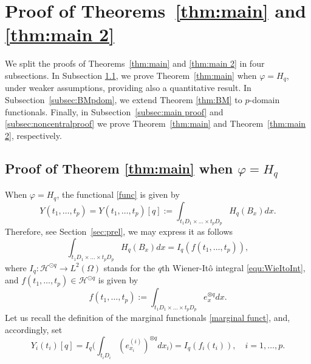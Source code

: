 \documentclass[12pt]{article}
\DeclareMathOperator{\1}{1}
\renewcommand{\L}{ L}
\renewcommand{\phi}{\varphi}
\theoremstyle{plain}
\theoremstyle{definition}
\begin{document}
\section{Proof of Theorems~\ref{thm:main} and \ref{thm:main 2}}\label{sec:sep}

We split the proofs of Theorems~\ref{thm:main} and \ref{thm:main 2} in four subsections. In Subsection \ref{subsec:Hq}, we prove Theorem~\ref{thm:main} when $\phi =H_q$, under weaker assumptions, providing also a quantitative result. In Subsection~\ref{subsec:BMpdom}, we extend Theorem \ref{thm:BM} to $p$-domain functionals. Finally, in Subsection~\ref{subsec:main proof} and \ref{subsec:noncentralproof} we prove Theorem~\ref{thm:main} and Theorem~\ref{thm:main 2}, respectively. 

\subsection{Proof of Theorem \ref{thm:main} when \texorpdfstring{$\phi = H_q$}{}}\label{subsec:Hq}

When $\phi=H_q$, the functional \eqref{func} is given by \begin{equation}
\label{Yq}
      Y(t_1,\ldots,t_p)= Y(t_1,\ldots,t_p)[q]:=\int_{t_1D_1\times\ldots\times t_pD_p} H_q(B_x)dx.
\end{equation}
Therefore, see Section~\ref{sec:prel}, we may express it as follows \begin{equation}\label{equ:defIGP}
    \int_{t_1D_1\times\ldots\times t_pD_p} H_q(B_x)dx = I_q(f(t_1,\ldots,t_p)),
\end{equation}
where $I_q:\mathcal H^{\odot q} \to \L^2(\Omega)$ stands for the $q$th Wiener-It\^o integral \eqref{equ:WieItoInt}, and $f(t_1,\ldots,t_p)\in \mathcal H^{\odot q}$ is given by \begin{equation}
    f(t_1,\ldots,t_p) := \int_{t_1D_1\times\ldots\times t_pD_p} e_{x}^{\otimes q} dx.
\end{equation}
Let us recall the definition of the marginal functionals \eqref{marginal funct}, and, accordingly, set
\begin{equation}\label{equ:defIGP2}
   Y_i{(t_i)}[q]=I_q\bigg(\int_{t_iD_i}(e_{x_i}^{(i)})^{\otimes q}dx_i \bigg) = I_q(f_i{(t_i)}), \quad i =1,\ldots, p.  
\end{equation}
\end{document}

